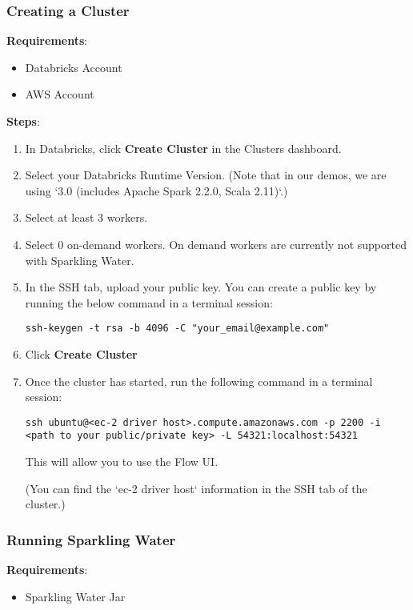 \subsubsection{Creating a Cluster}

\textbf{Requirements}:
\begin{itemize}
    \item Databricks Account
    \item AWS Account
\end{itemize}

\textbf{Steps}:
\begin{enumerate}
\item In Databricks, click \textbf{Create Cluster} in the Clusters dashboard.
\item Select your Databricks Runtime Version. (Note that in our demos, we are using `3.0 (includes Apache Spark 2.2.0, Scala 2.11)`.)
\item Select at least 3 workers.
\item Select 0 on-demand workers. On demand workers are currently not supported with Sparkling Water.
\item In the SSH tab, upload your public key.  You can create a public key by running the below command in a terminal session:
\begin{lstlisting}[style=Bash]
ssh-keygen -t rsa -b 4096 -C "your_email@example.com"
\end{lstlisting}
\item Click \textbf{Create Cluster}
\item Once the cluster has started, run the following command in a terminal session:
\begin{lstlisting}[style=Bash]
ssh ubuntu@<ec-2 driver host>.compute.amazonaws.com -p 2200 -i <path to your public/private key> -L 54321:localhost:54321
\end{lstlisting}
This will allow you to use the Flow UI.

(You can find the `ec-2 driver host` information in the SSH tab of the cluster.)

\end{enumerate}


\subsubsection{Running Sparkling Water}

\textbf{Requirements}:
\begin{itemize}
\item Sparkling Water Jar
\end{itemize}

